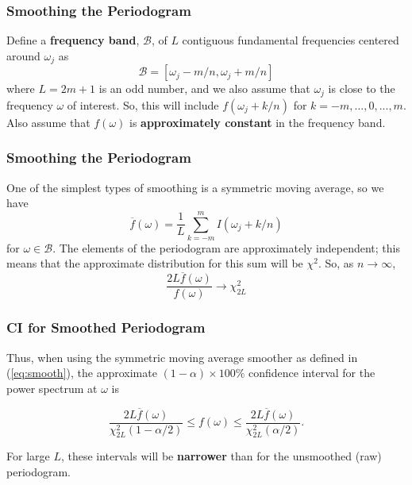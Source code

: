 \documentclass[%
xcolor=pdftex]{beamer}
\begin{document}
\begin{frame}
\frametitle{Smoothing the Periodogram}

Define a \textbf{frequency band}, $\mathcal{B}$, of $L$ contiguous fundamental frequencies centered
around $\omega_j$ as
\begin{equation} \label{eq:band}
\mathcal{B}=[\omega_j-m/n, \omega_j+m/n]
\end{equation}
where $L=2m+1$ is an odd number, and we also assume that
$\omega_j$ is close to the frequency $\omega$ of interest. So,
this will include $f(\omega_j+k/n)$ for $k=-m,...,0,...,m$. Also assume that $f(\omega)$ is \textbf{approximately constant} in the frequency band.

\end{frame}

\begin{frame}
\frametitle{Smoothing the Periodogram}

One of the simplest types of smoothing is a symmetric moving average, so we have
\begin{equation} \label{eq:smooth}
\overline{f}(\omega)=\frac{1}{L} \sum_{k=-m}^{m} I(\omega_j + k/n)
\end{equation}
for $\omega \in \mathcal{B}$. The elements of the periodogram
are approximately independent; this means that the approximate
distribution for this sum will be $\chi^2$.
So, as $n \to \infty$,
\begin{equation} \label{eq:chi}
\frac{2 L  \overline{f}(\omega)}{f(\omega)} \rightarrow \chi_{2 L}^2
\end{equation}

\end{frame}

\begin{frame}
\frametitle{CI for Smoothed Periodogram}

Thus, when using the symmetric moving average smoother as defined in (\ref{eq:smooth}), the approximate $(1-\alpha) \times 100\%$ confidence interval for the power spectrum at $\omega$ is

\begin{equation} \label{eq:CI}
\frac{2 L  \overline{f}(\omega)}{{\chi_{2L}^2(1-\alpha/2)}} \leq f(\omega) \leq \frac{2 L  \overline{f}(\omega)}{{\chi_{2L}^2(\alpha/2)}} .
\end{equation}

For large $L$, these intervals will be \textbf{narrower} than for the unsmoothed (raw) periodogram.

\end{frame}
\end{document}
